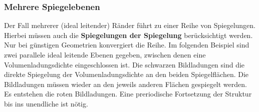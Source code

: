   \subsubsection{Mehrere Spiegelebenen}
		   Der Fall mehrerer (ideal leitender) Ränder führt zu einer Reihe von Spiegelungen.
		   Hierbei müssen auch die \textbf{Spiegelungen der Spiegelung} berücksichtigt werden.
		   Nur bei günstigen Geometrien konvergiert die Reihe. Im folgenden Beispiel sind zwei parallele ideal leitende Ebenen gegeben, zwischen denen eine Volumenladungsdichte eingeschlossen ist. Die schwarzen Bildladungen sind die direkte Spiegelung der Volumenladungsdichte an den beiden Spiegelflächen. Die Bildladungen müssen wieder an den jeweils anderen Flächen gespiegelt werden. Es entstehen die roten Bildladungen. Eine preriodische Fortsetzung der Struktur bis ins unendliche ist nötig.
	  \begin{center}
		  
	  \end{center}
